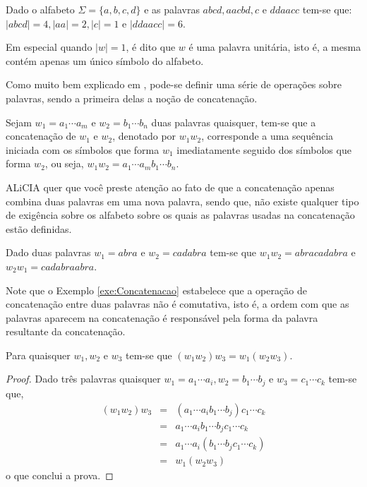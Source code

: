 \begin{exemplo}
	Dado o alfabeto $\Sigma = \{a, b, c, d\}$ e as palavras $abcd, aacbd, c$ e $ddaacc$ tem-se que: $|abcd| = 4, |aa| = 2, |c| = 1$ e $|ddaacc| = 6$.
\end{exemplo}

\begin{nota}
  Em especial quando $|w| = 1$, é dito que $w$ é uma palavra unitária, isto é, a mesma contém apenas um único símbolo do alfabeto.
\end{nota}

Como muito bem explicado em \cite{benjaLivro2010, hopcroft2008, linz2006}, pode-se definir uma série de operações sobre palavras, sendo a primeira delas  a noção de concatenação.

\begin{definicao}\label{def:Concatenacao}
	Sejam $w_1 = a_1\cdots a_m$ e $w_2 = b_1\cdots b_n$ duas palavras quaisquer, tem-se que a concatenação de $w_1$ e $w_2$, denotado por $w_1w_2$, corresponde a uma sequência iniciada com os símbolos que forma $w_1$ imediatamente seguido dos símbolos que forma $w_2$, ou seja, $w_1w_2 = a_1\cdots a_mb_1\cdots b_n$.
\end{definicao}

\begin{cuidado}
  ALiCIA quer que você preste atenção ao fato de que a concatenação apenas combina duas palavras em uma nova palavra, sendo que, não existe qualquer tipo de exigência sobre os alfabeto sobre os quais as palavras usadas na concatenação estão definidas.
\end{cuidado}

\begin{exemplo}\label{exe:Concatenacao}
	Dado duas palavras $w_1 = abra$ e $w_2 = cadabra$ tem-se que $w_1w_2 = abracadabra$ e $w_2w_1 = cadabraabra$.
\end{exemplo}

Note que o Exemplo \ref{exe:Concatenacao} estabelece que a operação de concatenação entre duas palavras não é comutativa, isto é, a ordem com que as palavras aparecem na concatenação é responsável pela forma da palavra resultante da concatenação.

\begin{teorema}\label{teo:AssociatividaeConcatenacao}
	Para quaisquer $w_1, w_2$ e $w_3$ tem-se que $(w_1w_2)w_3 = w_1(w_2w_3)$.
\end{teorema}

\begin{proof}
	Dado três palavras quaisquer $w_1 = a_1\cdots a_i, w_2 = b_1\cdots b_j$ e $w_3 = c_1\cdots c_k$ tem-se que,
	\begin{eqnarray*}
		(w_1w_2)w_3 & = & (a_1\cdots a_ib_1\cdots b_j)c_1\cdots c_k\\
		& = & a_1\cdots a_ib_1\cdots b_jc_1\cdots c_k\\
		& = & a_1\cdots a_i(b_1\cdots b_jc_1\cdots c_k)\\
		& = & w_1(w_2w_3)
	\end{eqnarray*}
	o que conclui a prova.
\end{proof}

